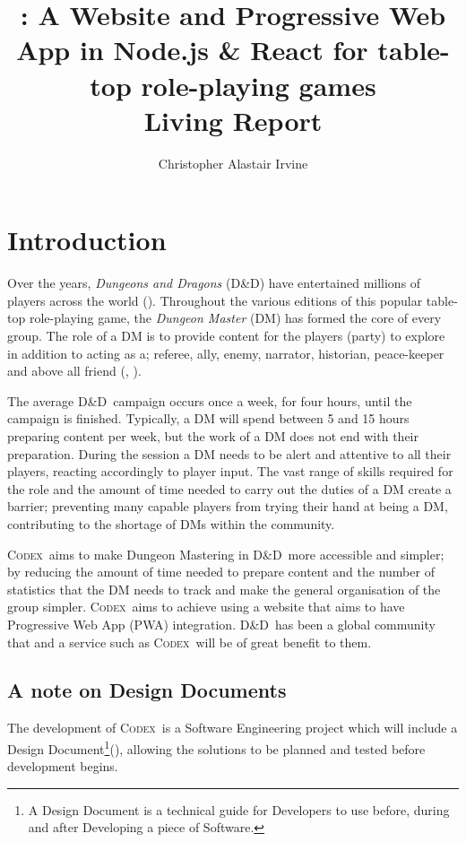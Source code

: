 \documentclass[review]{cmpreport}
\title{\Codex: A Website and Progressive Web App in Node.js \& React for table-top role-playing games \\ Living Report}
\author{Christopher Alastair Irvine}
\newcommand{\dnd}{D\&D}
\newcommand{\Codex}{\textsc{Codex}}
\begin{document}
	\section{Introduction}
	Over the years, \emph{Dungeons and Dragons} (\dnd) have entertained millions of players across the world (\cite{DnDOriginal}). Throughout the various editions of this popular table-top role-playing game, the \emph{Dungeon Master} (DM) has formed the core of every group. The role of a DM is to provide content for the players (party) to explore in addition to acting as a; referee, ally, enemy, narrator, historian, peace-keeper and above all friend (\cite{DnDPeople}, \cite{DungeonMaster}). 
	
	The average \dnd \ campaign occurs once a week, for four hours, until the campaign is finished. Typically, a DM will spend between 5 and 15 hours preparing content per week, but the work of a DM does not end with their preparation. During the session a DM needs to be alert and attentive to all their players, reacting accordingly to player input. The vast range of skills required for the role and the amount of time needed to carry out the duties of a DM create a  barrier; preventing many capable players from trying their hand at being a DM, contributing to the shortage of DMs within the community.
			
	\Codex \ aims to make Dungeon Mastering in \dnd \ more accessible and simpler; by reducing the amount of time needed to prepare content and the number of statistics that the DM needs to track and make the general organisation of the group simpler. \Codex \ aims to achieve using a website that aims to have Progressive Web App (PWA) integration. \dnd \ has been a global community that and a service such as \Codex \ will be of great benefit to them. 
	
	\subsection{A note on Design Documents}
	The development of \Codex \ is a Software Engineering project which will include a Design Document\footnote{A Design Document is a technical guide for Developers to use before, during and after Developing a piece of Software.}(\cite{DesignDocExample}), allowing the solutions to be planned and tested before development begins.
	
\end{document}
